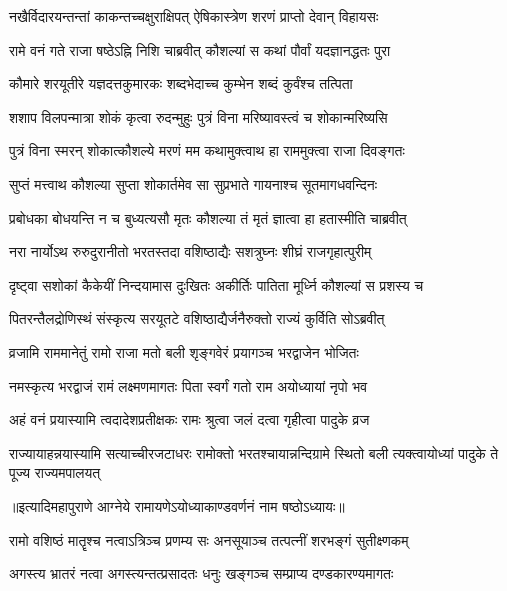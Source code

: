 \twolineshloka
{नखैर्विदारयन्तन्तां काकन्तच्चक्षुराक्षिपत्}
{ऐषिकास्त्रेण शरणं प्राप्तो देवान् विहायसः} %

\twolineshloka
{रामे वनं गते राजा षष्ठेऽह्नि निशि चाब्रवीत्}
{कौशल्यां स कथां पौर्वां यदज्ञानद्धतः पुरा} %

\twolineshloka
{कौमारे शरयूतीरे यज्ञदत्तकुमारकः}
{शब्दभेदाच्च कुम्भेन शब्दं कुर्वंश्च तत्पिता} %

\twolineshloka
{शशाप विलपन्मात्रा शोकं कृत्वा रुदन्मुहुः}
{पुत्रं विना मरिष्यावस्त्वं च शोकान्मरिष्यसि} %

\twolineshloka
{पुत्रं विना स्मरन् शोकात्कौशल्ये मरणं मम}
{कथामुक्त्वाथ हा राममुक्त्वा राजा दिवङ्गतः} %

\twolineshloka
{सुप्तं मत्त्वाथ कौशल्या सुप्ता शोकार्तमेव सा}
{सुप्रभाते गायनाश्च सूतमागधवन्दिनः} %

\twolineshloka
{प्रबोधका बोधयन्ति न च बुध्यत्यसौ मृतः}
{कौशल्या तं मृतं ज्ञात्वा हा हतास्मीति चाब्रवीत्} %

\twolineshloka
{नरा नार्योऽथ रुरुदुरानीतो भरतस्तदा}
{वशिष्ठाद्यैः सशत्रुघ्नः शीघ्रं राजगृहात्पुरीम्} %

\twolineshloka
{दृष्ट्वा सशोकां कैकेयीं निन्दयामास दुःखितः}
{अकीर्तिः पातिता मूर्ध्नि कौशल्यां स प्रशस्य च} %

\twolineshloka
{पितरन्तैलद्रोणिस्थं संस्कृत्य सरयूतटे}
{वशिष्ठाद्यैर्जनैरुक्तो राज्यं कुर्विति सोऽब्रवीत्} %

\twolineshloka
{व्रजामि राममानेतुं रामो राजा मतो बली}
{शृङ्गवेरं प्रयागञ्च भरद्वाजेन भोजितः} %

\twolineshloka
{नमस्कृत्य भरद्वाजं रामं लक्ष्मणमागतः}
{पिता स्वर्गं गतो राम अयोध्यायां नृपो भव} %

\twolineshloka
{अहं वनं प्रयास्यामि त्वदादेशप्रतीक्षकः}
{रामः श्रुत्वा जलं दत्वा गृहीत्वा पादुके व्रज} %

\threelineshloka
{राज्यायाहन्नयास्यामि सत्याच्चीरजटाधरः}
{रामोक्तो भरतश्चायान्नन्दिग्रामे स्थितो बली} %
{त्यक्त्वायोध्यां पादुके ते पूज्य राज्यमपालयत्} %

॥इत्यादिमहापुराणे आग्नेये रामायणेऽयोध्याकाण्डवर्णनं नाम षष्ठोऽध्यायः॥



\twolineshloka
{रामो वशिष्ठं मातॄश्च नत्वाऽत्रिञ्च प्रणम्य सः}
{अनसूयाञ्च तत्पत्नीं शरभङ्गं सुतीक्ष्णकम्}%

\twolineshloka
{अगस्त्य भ्रातरं नत्वा अगस्त्यन्तत्प्रसादतः}
{धनुः खङ्गञ्च सम्प्राप्य दण्डकारण्यमागतः}%

